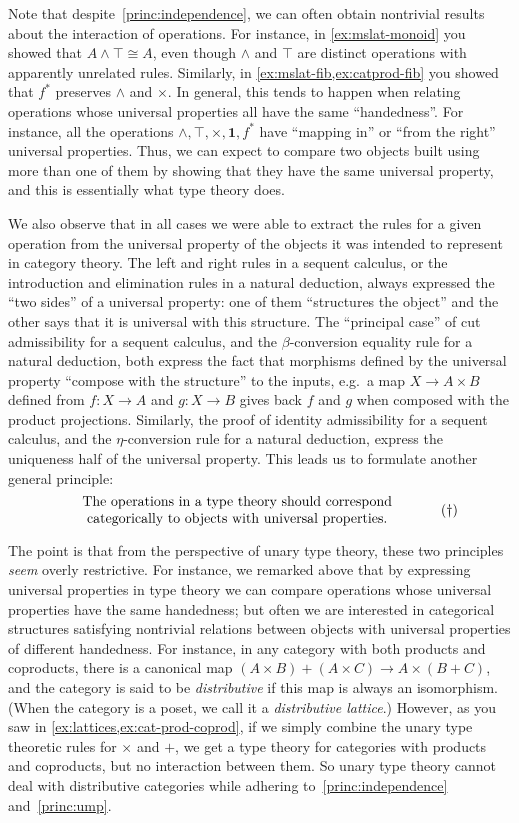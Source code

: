 \documentclass{book}
\let\meet\wedge
\def\unit{\mathbf{1}}
\begin{document}
Note that despite~\eqref{princ:independence}, we can often obtain nontrivial results about the interaction of operations.
For instance, in \cref{ex:mslat-monoid} you showed that $A\meet \top\cong A$, even though $\meet$ and $\top$ are distinct operations with apparently unrelated rules.
Similarly, in \cref{ex:mslat-fib,ex:catprod-fib} you showed that $f^*$ preserves $\meet$ and $\times$.
In general, this tends to happen when relating operations whose universal properties all have the same ``handedness''.
For instance, all the operations $\meet,\top,\times,\unit,f^*$ have ``mapping in'' or ``from the right'' universal properties.
Thus, we can expect to compare two objects built using more than one of them by showing that they have the same universal property, and this is essentially what type theory does.

We also observe that in all cases we were able to extract the rules for a given operation from the universal property of the objects it was intended to represent in category theory.
The left and right rules in a sequent calculus, or the introduction and elimination rules in a natural deduction, always expressed the ``two sides'' of a universal property: one of them ``structures the object'' and the other says that it is universal with this structure.
The ``principal case'' of cut admissibility for a sequent calculus, and the $\beta$-conversion equality rule for a natural deduction, both express the fact that morphisms defined by the universal property ``compose with the structure'' to the inputs, e.g.\ a map $X\to A\times B$ defined from $f:X\to A$ and $g:X\to B$ gives back $f$ and $g$ when composed with the product projections.
Similarly, the proof of identity admissibility for a sequent calculus, and the $\eta$-conversion rule for a natural deduction, express the uniqueness half of the universal property.
This leads us to formulate another general principle:
\begin{equation}\label{princ:ump}
  \parbox{3.5in}{\centering The operations in a type theory should correspond categorically to objects with universal properties.}\tag{$\dagger$}
\end{equation}

The point is that from the perspective of unary type theory, these two principles \emph{seem} overly restrictive.
For instance, we remarked above that by expressing universal properties in type theory we can compare operations whose universal properties have the same handedness; but often we are interested in categorical structures satisfying nontrivial relations between objects with universal properties of different handedness.
For instance, in any category with both products and coproducts, there is a canonical map $(A\times B)+(A\times C) \to A\times (B+C)$, and the category is said to be \emph{distributive} if this map is always an isomorphism.
(When the category is a poset, we call it a \emph{distributive lattice}.)
However, as you saw in \cref{ex:lattices,ex:cat-prod-coprod}, if we simply combine the unary type theoretic rules for $\times$ and $+$, we get a type theory for categories with products and coproducts, but no interaction between them.
So unary type theory cannot deal with distributive categories while adhering to~\eqref{princ:independence} and~\eqref{princ:ump}.
\end{document}
